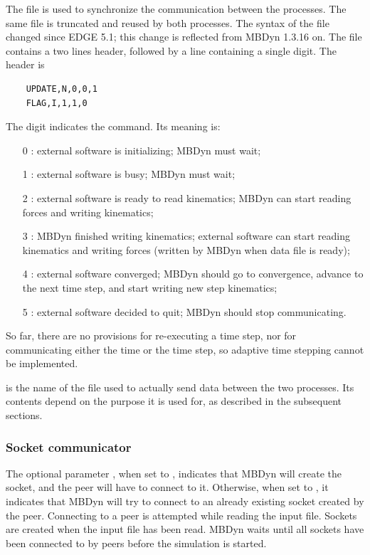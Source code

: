 The file  is used to synchronize the communication
between the processes.
The same file is truncated and reused by both processes.
The syntax of the file changed since EDGE 5.1; this change is reflected
from MBDyn 1.3.16 on.
The file contains a two lines header, followed by a line containing a single digit.
The header is
\begin{verbatim}
    UPDATE,N,0,0,1
    FLAG,I,1,1,0
\end{verbatim}
The digit indicates the command.  Its meaning is:
\begin{itemize}
\item[0 :] external software is initializing; MBDyn must wait;
\item[1 :] external software is busy; MBDyn must wait;
\item[2 :] external software is ready to read kinematics; MBDyn can start reading forces and writing kinematics;
\item[3 :] MBDyn finished writing kinematics; external software can start reading kinematics and writing forces
	(written by MBDyn when data file is ready);
\item[4 :] external software converged; MBDyn should go to convergence, advance to the next time step,
and start writing new step kinematics;
\item[5 :] external software decided to quit; MBDyn should stop communicating.
\end{itemize}
So far, there are no provisions for re-executing a time step,
nor for communicating either the time or the time step,
so adaptive time stepping cannot be implemented.

 is the name of the file used to actually send data
between the two processes.
Its contents depend on the purpose it is used for,
as described in the subsequent sections.



\subsubsection{Socket communicator}
The optional parameter , when set to , indicates
that MBDyn will create the socket, and the peer will have to connect to it.
Otherwise, when set to , it indicates that MBDyn will try to connect
to an already existing socket created by the peer.
Connecting to a peer is attempted while reading the input file.
Sockets are created when the input file has been read.
MBDyn waits until all sockets have been connected to by peers
before the simulation is started.

